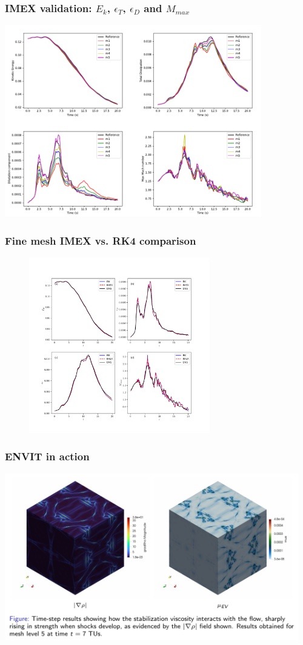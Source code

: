 \begin{frame}
    \frametitle{IMEX validation: $E_k$, $\epsilon_T$, $\epsilon_D$ and $M_{max}$}
    \includegraphics[width=0.84\textwidth]{images/tgv_trackers.png}
\end{frame}

\begin{frame}
    \frametitle{Fine mesh IMEX vs. RK4 comparison}
    \begin{figure}
      \centering
      \includegraphics[width=0.7\textwidth]{images/imex_rk_comp.pdf}
    \end{figure}
\end{frame}

\begin{frame}
      \frametitle{ENVIT in action}
      \includegraphics[width=0.96\textwidth]{images/tgv_field_t7.png}
\end{frame}

